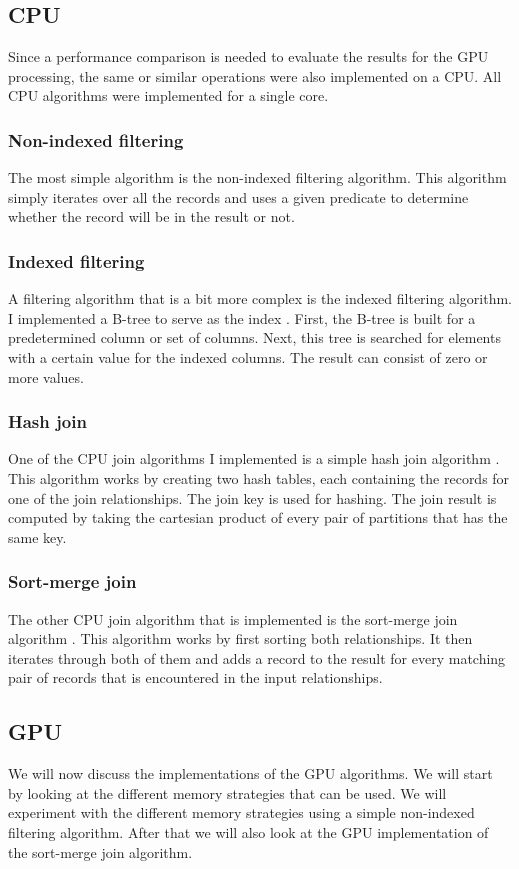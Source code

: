 \documentclass[a4paper,titlepage]{article}
\begin{document}
\subsection{CPU}
Since a performance comparison is needed to evaluate the results for the GPU processing, the same or similar operations were also implemented on a CPU. All CPU algorithms were implemented for a single core.

\subsubsection{Non-indexed filtering}
The most simple algorithm is the non-indexed filtering algorithm. This algorithm simply iterates over all the records and uses a given predicate to determine whether the record will be in the result or not.

\subsubsection{Indexed filtering}
A filtering algorithm that is a bit more complex is the indexed filtering algorithm. I implemented a B-tree to serve as the index \cite{comer1979}. First, the B-tree is built for a predetermined column or set of columns. Next, this tree is searched for elements with a certain value for the indexed columns. The result can consist of zero or more values.

\subsubsection{Hash join}
One of the CPU join algorithms I implemented is a simple hash join algorithm \cite{dewitt1985}. This algorithm works by creating two hash tables, each containing the records for one of the join relationships. The join key is used for hashing. The join result is computed by taking the cartesian product of every pair of partitions that has the same key.

\subsubsection{Sort-merge join}
The other CPU join algorithm that is implemented is the sort-merge join algorithm \cite{blasgen1977}. This algorithm works by first sorting both relationships. It then iterates through both of them and adds a record to the result for every matching pair of records that is encountered in the input relationships.

\subsection{GPU}
\label{sec:gpu-implementation}
We will now discuss the implementations of the GPU algorithms. We will start by looking at the different memory strategies that can be used. We will experiment with the different memory strategies using a simple non-indexed filtering algorithm. After that we will also look at the GPU implementation of the sort-merge join algorithm.
\end{document}
